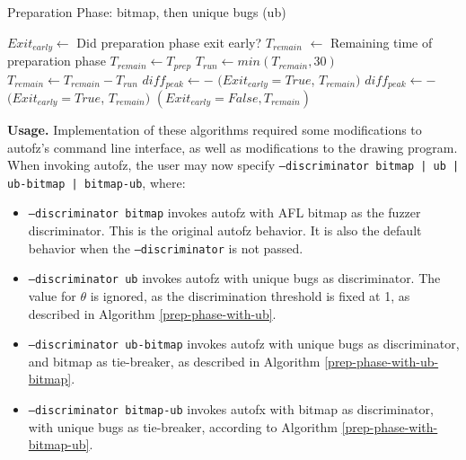 \begin{algorithm}[h!]
  \caption{Preparation Phase: bitmap, then unique bugs (ub)}\label{prep-phase-with-bitmap-ub}
  \small
  \begin{algorithmic}[1]
    \Output
      \State $Exit_{early} \gets$ Did preparation phase exit early?
      \State $T_{remain}$ $\gets$ Remaining time of preparation phase
    \EndOutput
      \State $T_{remain} \gets T_{prep}$
        \State $T_{run} \gets min(T_{remain},30)$
            \State {}
          \EndFor
        \Else {}
          \State {}
        \EndIf
        \State $T_{remain} \gets T_{remain} - T_{run}$
        \State $diff_{peak} \gets $$ - $
          \State \Return $(Exit_{early}=True$, $T_{remain})$
        \Else {}
          \State $diff_{peak} \gets $$ - $
              \State \Return $(Exit_{early}=True$, $T_{remain})$
          \EndIf
        \EndIf
      \EndWhile
      \State \Return $(Exit_{early}=False, T_{remain})$
    \EndFunction
  \end{algorithmic}
\end{algorithm}

\textbf{Usage.} Implementation of these algorithms required some modifications to autofz's 
command line interface, as well as modifications to the drawing program. When invoking 
autofz, the user may now specify \texttt{--discriminator bitmap | ub | ub-bitmap | bitmap-ub},
where:

\begin{itemize}
  \item \texttt{--discriminator bitmap} invokes autofz with AFL bitmap as the 
  fuzzer discriminator. This is the original autofz behavior. It is also the default behavior 
  when the \texttt{--discriminator} is not passed.
  \item \texttt{--discriminator ub} invokes autofz with unique bugs as discriminator. The 
  value for $\theta$ is ignored, as the discrimination threshold is fixed at 1, as described 
  in Algorithm \ref{prep-phase-with-ub}.
  \item \texttt{--discriminator ub-bitmap} invokes autofz with unique bugs as discriminator, 
  and bitmap as tie-breaker, as described in Algorithm \ref{prep-phase-with-ub-bitmap}.
  \item \texttt{--discriminator bitmap-ub} invokes autofx with bitmap as discriminator, 
  with unique bugs as tie-breaker, according to Algorithm \ref{prep-phase-with-bitmap-ub}.
\end{itemize}